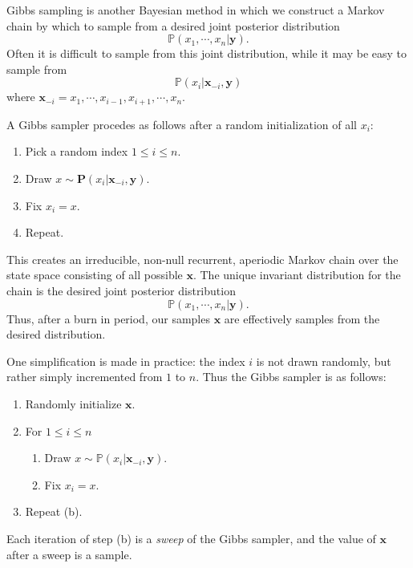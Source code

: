 

Gibbs sampling is another Bayesian method in which we construct a Markov chain by which to sample from a desired joint posterior distribution $$\mathbb{P}(x_{1},\cdots,x_{n} | \mathbf{y}).$$ Often it is difficult to sample from this joint distribution, while it may be easy to sample from $$\mathbb{P}(x_{i} | \mathbf{x}_{-i}, \mathbf{y})$$ where $\mathbf{x}_{-i} = x_{1},\cdots,x_{i-1},x_{i+1},\cdots,x_{n}.$

A Gibbs sampler procedes as follows after a random initialization of all $x_{i}$:
\begin{enumerate}
	\item Pick a random index $1 \leq i \leq n$.
	\item Draw $x \sim \mathbf{P}(x_{i} | \mathbf{x}_{-i}, \mathbf{y})$.
	\item Fix $x_{i} = x$.
	\item Repeat.
\end{enumerate}

This creates an irreducible, non-null recurrent, aperiodic Markov chain over the state space consisting of all possible $\mathbf{x}$. The unique invariant distribution for the chain is the desired joint posterior distribution $$\mathbb{P}(x_{1},\cdots,x_{n} | \mathbf{y}).$$ Thus, after a burn in period, our samples $\mathbf{x}$ are effectively samples from the desired distribution.

One simplification is made in practice: the index $i$ is not drawn randomly, but rather simply incremented from $1$ to $n$. Thus the Gibbs sampler is as follows:
\begin{enumerate}
	\item Randomly initialize $\mathbf{x}$.
	\item For $1 \leq i \leq n$
	\begin{enumerate}
		\item Draw $x \sim \mathbb{P}(x_{i} | \mathbf{x}_{-i}, \mathbf{y})$.
		\item Fix $x_{i} = x$.
	\end{enumerate}
	\item Repeat (b).
\end{enumerate}

Each iteration of step (b) is a \emph{sweep} of the Gibbs sampler, and the value of $\mathbf{x}$ after a sweep is a sample.

